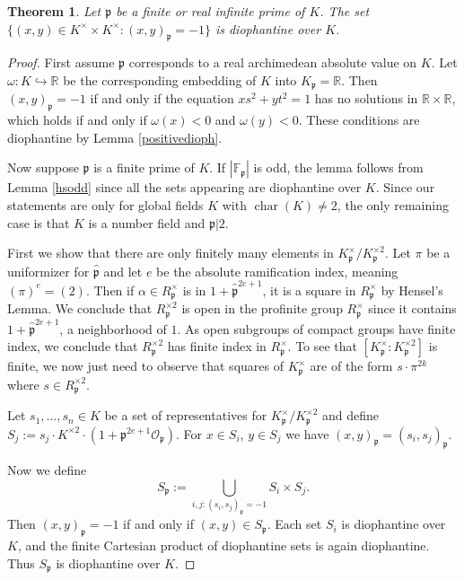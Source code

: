 \documentclass[12pt,reqno]{amsart}
\newcommand{\OO}{\mathcal{O}}
\newcommand{\RR}{\mathbb{R}}
\newcommand{\FF}{\mathbb{F}}
\newcommand{\pp}{\mathfrak{p}}
\DeclareMathOperator{\ch}{char}
\newtheorem{thm}{Theorem}[section]
\theoremstyle{definition}
\begin{document}
\begin{thm}\label{nonlocnorm}
Let $\pp$ be a finite or real infinite prime of $K$. The set $\{(x,y)\in K^{\times}\times K^{\times}: (x,y)_{\pp}=-1\}$ is diophantine over $K$.
\end{thm}

\begin{proof}
First assume $\pp$ corresponds to a real archimedean absolute value on
$K$. Let $\omega:K\hookrightarrow \RR$ be the corresponding embedding
of $K$ into $K_{\pp}=\RR$. Then $(x,y)_{\pp}=-1$ if and only if the
equation $xs^2+yt^2=1$ has no solutions in $\RR\times \RR$, which
holds if and only if $\omega(x)<0$ and $\omega(y)<0$. These conditions
are diophantine by Lemma \ref{positivedioph}. 

Now suppose $\pp$ is a finite prime of $K$. If $|\FF_{\pp}|$ is odd, the lemma follows from Lemma \ref{hsodd} since all the sets appearing are diophantine over $K$. Since our statements are only for global fields $K$ with $\ch(K)\not=2$, the only remaining case is that $K$ is a number field and $\pp|2$. 

First we show that there are only finitely many elements in $K_{\pp}^{\times}/K_{\pp}^{\times2}$. Let $\pi$ be a uniformizer for $\hat{\pp}$ and let $e$ be the absolute ramification index, meaning $(\pi)^e=(2)$. Then if $\alpha\in R_{\pp}^{\times}$ is in $1+\hat{\pp}^{2e+1}$, it is a square in $R_{\pp}^{\times}$ by Hensel's Lemma. We conclude that $R_{\pp}^{\times2}$ is open in the profinite group $R_{\pp}^{\times}$ since it contains $1+\hat{\pp}^{2e+1}$, a neighborhood of $1$. As open subgroups of compact groups have finite index, we conclude that $R_{\pp}^{\times2}$ has finite index in $R_{\pp}^{\times}$. To see that $[K_{\pp}^{\times}:K_{\pp}^{\times2}]$ is finite, we now just need to observe that squares of $K_{\pp}^{\times}$ are of the form $s\cdot\pi^{2k}$ where $s\in R_{\pp}^{\times2}$. 



Let $s_1,\ldots,s_n\in K$ be a set of representatives for $K_{\pp}^{\times}/K_{\pp}^{\times2}$ and define $S_j:= s_j\cdot K^{\times2}\cdot(1+\pp^{2e+1}\OO_{\pp})$. For $x\in S_i$, $y\in S_j$ we have $(x,y)_{\pp}=(s_i,s_j)_{\pp}$.

Now we define
\[
S_{\pp}:=\bigcup_{i,j: (s_i,s_j)_{\pp}=-1} S_i\times S_j.
\]
Then $(x,y)_{\pp}=-1$ if and only if $(x,y)\in S_{\pp}$. Each set $S_i$ is diophantine over $K$, and the finite Cartesian product of diophantine sets is again diophantine. Thus $S_{\pp}$ is diophantine over $K$.
  
\end{proof}
\end{document}
